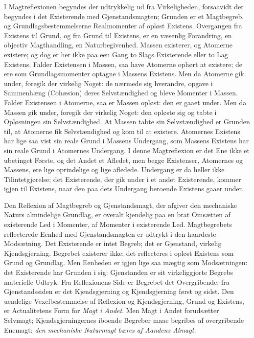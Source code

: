 \documentclass[12pt,a4paper]{book}
\begin{document}
I Magtreflexionen begyndes der udtrykkelig ud fra Virkeligheden,
forsaavidt der begyndes i det Existerende med Gjenstandsmagten;
Grunden er et Magtbegreb, og Grundlagsbestemmelserne Realmomenter af
opløst Existens. Overgangen fra Existens til Grund, og fra Grund til
Existens, er en væsenlig Forandring, en objectiv Magthandling, en
Naturbegivenhed. Massen existerer, og Atomerne existere; og dog er her
ikke paa een Gang to Slags Existerende eller to Lag Existens. Falder
Existensen i Massen, saa have Atomerne ophørt at existere; de ere som
Grundlagsmomenter optagne i Massens Existens. Men da Atomerne gik
under, foregik der virkelig Noget: de nærmede sig hverandre, opgave i
Sammenhæng (Cohæsion) deres Selvstændighed og bleve Momenter i Massen.
Falder Existensen i Atomerne, saa er Massen opløst: den er gaaet
under. Men da Massen gik under, foregik der virkelig Noget: den
opløste sig og tabte i Opløsningen sin Selvstændighed. At Massen tabte
sin Selvstændighed er Grunden til, at Atomerne fik Selvstændighed og
kom til at existere. Atomernes Existens har lige saa vist sin reale
Grund i Massens Undergang, som Massens Existens har sin reale Grund i
Atomernes Undergang. I denne Magtreflexion er det Ene ikke et
ubetinget Første, og det Andet et Afledet, men begge Existenser,
Atomernes og Massens, ere lige oprindelige og lige afledede. Undergang
er da heller ikke Tilintetgjørelse; det Existerende, der gik under i et
andet Existerende, kommer igjen til Existens, naar den paa dets
Undergang beroende Existens gaaer under.

Den Reflexion af Magtbegreb og Gjenstandsmagt, der afgiver den
mechaniske Naturs almindelige Grundlag, er overalt kjendelig paa en
brat Omsætten af existerende Led i Momenter, af Momenter i existerende
Led. Magtbegrebets
reflecterede Eenhed med Gjenstandsmagten er udtrykt i den haardeste
Modsætning. Det Existerende er intet Begreb; det er Gjenstand,
virkelig Kjendsgjerning. Begrebet existerer ikke; det reflecteres i
opløst Existens som Grund og Grundlag. Men Eenheden er igjen lige saa
mægtig som Modsætningen: det Existerende har Grunden i sig:
Gjenstanden er sit virkeliggjorte Begrebs materielle Udtryk. Fra
Reflexionens Side er Begrebet det Overgribende; fra Gjenstandssiden er
det Kjendsgjerning og Kjendsgjerning først og sidst. Den uendelige
Vexelbestemmelse af Reflexion og Kjendsgjerning, Grund og Existens, er
Actualitetens Form for \emph{Magt i Andet}. Men Magt i Andet
forudsætter Selvmagt; Kjendsgjerningernes iboende Begreber maae
begribes af overgribende Enemagt: \emph{den mechaniske Naturmagt bæres
af Aandens Almagt.}
\end{document}
